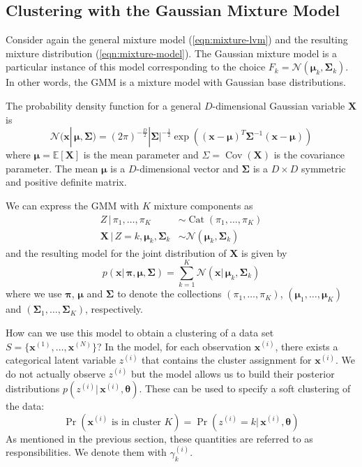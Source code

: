 \documentclass[final,3p,times,twocolumn]{elsarticle}
\DeclareMathOperator*{\Cov}{Cov}
\DeclareMathOperator*{\Cat}{Cat}
\let\bs\boldsymbol
\begin{document}
\subsection{Clustering with the Gaussian Mixture Model}
Consider again the general mixture model (\ref{eqn:mixture-lvm}) and the resulting mixture distribution (\ref{eqn:mixture-model}).
The Gaussian mixture model is a particular instance of this model corresponding to the choice $F_k = \mathcal{N}(\bs\mu_k,\bs\Sigma_k)$.
In other words, the GMM is a mixture model with Gaussian base distributions.

The probability density function for a general $D$-dimensional Gaussian variable $\bs X$ is
\begin{equation}
\label{eqn:gauss-pdf}
\mathcal{N}(\bs x|\,\bs\mu,\bs\Sigma) = (2\pi)^{-\frac{D}{2}}|\bs\Sigma|^{-\frac{1}{2}}\exp\left((\bs x - \bs\mu)^T\bs\Sigma^{-1}(\bs x-\bs\mu)\right)
\end{equation}
where $\bs\mu = \mathbb{E}[\bs X]$ is the mean parameter and $\Sigma = \Cov(\bs X)$ is the covariance parameter.
The mean $\bs\mu$ is a $D$-dimensional vector and $\bs\Sigma$ is a $D\times D$ symmetric and positive definite matrix.

We can express the GMM with $K$ mixture components as
\begin{equation*}
\begin{split}
Z\,|\,\pi_1,\dots,\pi_K &\sim \Cat(\pi_1,\dots,\pi_K)\\
\bs X \,|\,Z=k,\bs\mu_k,\bs\Sigma_k &\sim \mathcal{N}(\bs\mu_k,\bs\Sigma_k)
\end{split}
\end{equation*}
and the resulting model for the joint distribution of $\bs X$ is given by
\begin{equation}
\label{eqn:gmm-density}
p(\bs x|\,\bs\pi,\bs\mu,\bs\Sigma) = \sum_{k=1}^K \mathcal{N}(\bs x|\,\bs\mu_k,\bs\Sigma_k)
\end{equation}
where we use $\bs\pi$, $\bs\mu$ and $\bs\Sigma$ to denote the collections $(\pi_1,\dots,\pi_K)$, $(\bs\mu_1,\dots,\bs\mu_K)$ and $(\bs\Sigma_1,\dots,\bs\Sigma_K)$, respectively.

How can we use this model to obtain a clustering of a data set $S = \{\bs x^{(1)},\dots,\bs x^{(N)}\}$?
In the model, for each observation $\bs x^{(i)}$, there exists a categorical latent variable $z^{(i)}$ that contains the cluster assignment for $\bs x^{(i)}$.
We do not actually observe $z^{(i)}$ but the model allows us to build their posterior distributions $p(z^{(i)}|\,\bs x^{(i)},\bs \theta)$.
These can be used to specify a soft clustering of the data:
\begin{equation*}
\Pr(\mbox{$\bs x^{(i)}$ is in cluster $K$}) = \Pr(z^{(i)} = k|\,\bs x^{(i)},\bs\theta)
\end{equation*}
As mentioned in the previous section, these quantities are referred to as responsibilities. We denote them with $\gamma_k^{(i)}$.
\end{document}
